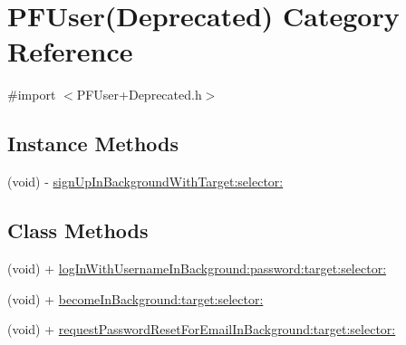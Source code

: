 \hypertarget{category_p_f_user_07_deprecated_08}{}\section{P\+F\+User(Deprecated) Category Reference}
\label{category_p_f_user_07_deprecated_08}


{\ttfamily \#import $<$P\+F\+User+\+Deprecated.\+h$>$}

\subsection*{Instance Methods}
\begin{DoxyCompactItemize}
\item 
(void) -\/ \hyperlink{category_p_f_user_07_deprecated_08_a02d96a7bd6d61e0a79fb020cacb9189f}{sign\+Up\+In\+Background\+With\+Target\+:selector\+:}
\begin{DoxyCompactList}\small\item\em 

 \end{DoxyCompactList}\end{DoxyCompactItemize}
\subsection*{Class Methods}
\begin{DoxyCompactItemize}
\item 
(void) + \hyperlink{category_p_f_user_07_deprecated_08_af734a968312e3fa6bd6836770c84193f}{log\+In\+With\+Username\+In\+Background\+:password\+:target\+:selector\+:}
\begin{DoxyCompactList}\small\item\em 

 \end{DoxyCompactList}\item 
(void) + \hyperlink{category_p_f_user_07_deprecated_08_a8078303b4f51781e429cd2482b003d73}{become\+In\+Background\+:target\+:selector\+:}
\begin{DoxyCompactList}\small\item\em 

 \end{DoxyCompactList}\item 
(void) + \hyperlink{category_p_f_user_07_deprecated_08_a86775d2489953988c8e20838b26fb6d4}{request\+Password\+Reset\+For\+Email\+In\+Background\+:target\+:selector\+:}
\begin{DoxyCompactList}\small\item\em 

 \end{DoxyCompactList}\end{DoxyCompactItemize}


